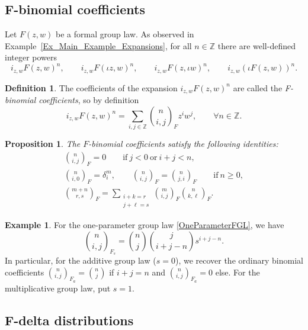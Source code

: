 \documentclass[pdftex]{sigma}
\numberwithin{equation}{section}
\newtheorem{Proposition}[Theorem]{Proposition}
\theoremstyle{definition}
\newtheorem{Definition}[Theorem]{Definition}
\newtheorem{Example}[Theorem]{Example}
\newcommand\Fbinom[2]{\binom{#1}{#2}_{\!\!F}}
\begin{document}
\subsection[F-binomial coefficient]{$\boldsymbol{F}$-binomial coefficients}\label{s35}

Let $F(z,w)$ be a formal group law. As observed in Example~\ref{Ex_Main_Example_Expansions}, for all $n\in\mathbb{Z}$ there are well-defined integer powers
\[
 i_{z,w}F(z,w)^n,\qquad i_{z,w}F(\iota z,w)^n,\qquad i_{z,w}F(z,\iota w)^n,\qquad i_{z,w}(\iota F(z,w))^n.
\]

\begin{Definition}
The coefficients of the expansion $i_{z,w}F(z,w)^n$ are called the \emph{F-binomial coefficients}, so by definition
\begin{equation}
\label{def-F-binom}
 i_{z,w}F(z,w)^n=\sum_{i,j\in\mathbb{Z}}\Fbinom{n}{i,j} z^iw^j,\qquad\forall n\in\mathbb{Z}.
\end{equation}
\end{Definition}

\begin{Proposition}
The $F$-binomial coefficients satisfy the following identities:
\begin{gather*}%
 \Fbinom{n}{i,j}=0
 \qquad\text{if} \ j<0 \ \text{or} \ i+j<n,\\
 \Fbinom{n}{i,0}=\delta_i^m,\qquad
\Fbinom{n}{i,j}=\Fbinom{n}{j,i}
\qquad\text{if}\ n\geqslant0,\\
 \Fbinom{m+n}{r,s}=\sum_{\substack{i+k=r\\j+\ell=s}} \Fbinom{m}{i,j}\Fbinom{n}{k,\ell}.
\end{gather*}
\end{Proposition}

\begin{Example}
For the one-parameter group law \eqref{OneParameterFGL}, we have
\[
 \binom{n}{i,j}_{\!\!F_s}=\binom{n}{j}\binom{j}{i+j-n}s^{i+j-n}.
\]
In particular, for the additive group law ($s=0$), we recover the ordinary binomial coefficients $\binom{n}{i,j}_{\!\!F_a}=\binom{n}{j}$ if $i+j=n$ and $\binom{n}{i,j}_{\!\!F_a}=0$ else. For the multiplicative group law, put $s=1$.%
\end{Example}

\subsection[F-delta distributions]{$\boldsymbol{F}$-delta distributions}
\label{s36}
\end{document}

